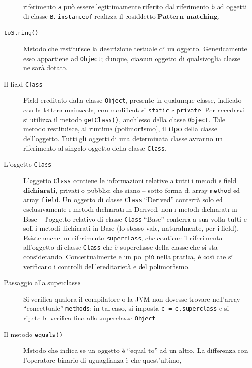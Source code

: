 \documentclass[\fontsizeclass,twocolumn]{\classname}
\theoremstyle{definition}
\theoremstyle{definition}
\begin{document}
\begin{description}
        riferimento \texttt{a} può essere legittimamente riferito dal
        riferimento \texttt{b} ad oggetti di classe \texttt{B}.
        \texttt{instanceof} realizza il cosiddetto \textbf{Pattern matching}.
    \item[\texttt{toString()}] Metodo che restituisce la descrizione testuale
        di un oggetto. Genericamente esso appartiene ad \texttt{Object};
        dunque, ciascun oggetto di qualsivoglia classe ne sarà dotato.
    \item[Il field \texttt{Class}] Field ereditato dalla classe
        \texttt{Object}, presente in qualunque classe, indicato con la lettera
        maiuscola, con modificatori \texttt{static} e \texttt{private}. Per
        accedervi si utilizza il metodo \texttt{getClass()}, anch'esso della
        classe \texttt{Object}. Tale metodo restituisce, al runtime
        (polimorfismo), il \textbf{tipo} della classe dell'oggetto. Tutti gli
        oggetti di una determinata classe avranno un riferimento al singolo
        oggetto della classe \texttt{Class}.
    \item[L'oggetto \texttt{Class}] L'oggetto \texttt{Class} contiene le
        informazioni relative a tutti i metodi e field \textbf{dichiarati},
        privati o pubblici che siano -- sotto forma di array \texttt{method} ed
        array \texttt{field}. Un oggetto di classe \texttt{Class} ``Derived''
        conterrà solo ed esclusivamente i metodi dichiarati in Derived, non i
        metodi dichiarati in Base -- l'oggetto relativo di classe
        \texttt{Class} ``Base'' conterrà a sua volta tutti e soli i metodi
        dichiarati in Base (lo stesso vale, naturalmente, per i field). Esiste
        anche un riferimento \texttt{superclass}, che contiene il riferimento
        all'oggetto di classe \texttt{Class} che è superclasse della classe che
        si sta considerando. Concettualmente e un po' più nella pratica, è così
        che si verificano i controlli dell'ereditarietà e del polimorfismo.
    \item[Passaggio alla superclasse] Si verifica qualora il compilatore o la
        JVM non dovesse trovare nell'array ``concettuale'' \texttt{methods}; in
        tal caso, si imposta \texttt{c = c.superclass} e si ripete la verifica
        fino alla superclasse \texttt{Object}.
    \item[Il metodo \texttt{equals()}] Metodo che indica se un oggetto è
        ``equal to'' ad un altro. La differenza con l'operatore binario di
        uguaglianza è che quest'ultimo,
        \begin{itemize}

\end{itemize}
\end{description}
\end{document}

